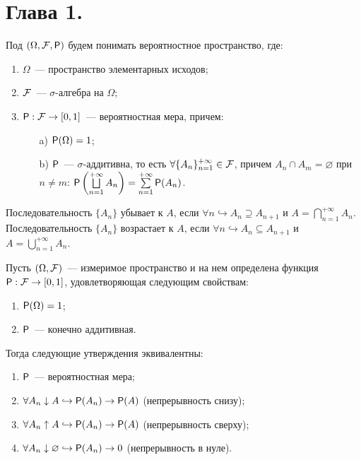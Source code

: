 \section{Глава 1.}
\begin{definition}
    Под $(\Omega, \F, \P)$ будем понимать вероятностное пространство, где:
    \begin{enumerate}
    	\item $\Omega$~--- пространство элементарных исходов;
    	\item $\F$~--- $\sigma$-алгебра на $\Omega$;
    	\item{$\P: \F \rightarrow [0, 1]$~--- вероятностная мера, причем:
    		\begin{enumerate}
    			\item[a)] $\P (\Omega) = 1$;
    			\item[b)] $\P$~--- $\sigma$-аддитивна, то есть $\forall \{A_n\}_{n = 1}^{+\infty} \in \F$, причем $A_n \cap A_m = \varnothing$ при $n \neq m$: $\P \left( \bigsqcup\limits_{n=1}^{+\infty} A_n \right) = \sum \limits_{n = 1}^{+\infty} \P (A_n)$.
    		\end{enumerate}
    	}
    \end{enumerate}
\end{definition}

\begin{definition}
	Последовательность $\{A_n\}$ убывает к $A$, если $\forall n \hookrightarrow A_{n} \supseteq A_{n+1}$ и   $A = \bigcap\limits_{n = 1}^{+\infty} A_n$.
	Последовательность $\{A_n\}$ возрастает к $A$, если $\forall n \hookrightarrow A_{n} \subseteq A_{n+1}$ и   $A = \bigcup\limits_{n = 1}^{+\infty} A_n$.
\end{definition}

\begin{theorem}
	Пусть $(\Omega, \F )$~--- измеримое пространство и на нем определена функция $\P: \F \rightarrow [0,1]$, удовлетворяющая следующим свойствам: 
	\begin{enumerate}
	    \item $\P (\Omega) = 1$;
	    \item  $\P$~--- конечно аддитивная.
	\end{enumerate} 
	Тогда следующие утверждения эквивалентны:
	\begin{enumerate}
		\item $\P$~--- вероятностная мера;
		\item $\forall A_n \downarrow A \hookrightarrow \P (A_n) \rightarrow \P(A)$ (непрерывность снизу);
		\item $\forall A_n \uparrow A \hookrightarrow \P (A_n) \rightarrow \P(A)$ (непрерывность сверху);
		\item  $\forall A_n \downarrow \varnothing \hookrightarrow \P (A_n) \rightarrow 0$ (непрерывность в нуле).
	\end{enumerate}
\end{theorem}

